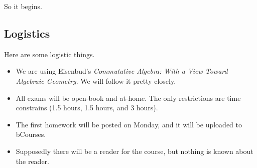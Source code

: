 







So it begins.

\subsection{Logistics}
Here are some logistic things.
\begin{itemize}
	\item We are using Eisenbud's \textit{Commutative Algebra: With a View Toward Algebraic Geometry}. We will follow it pretty closely.
	\item All exams will be open-book and at-home. The only restrictions are time constrains (1.5 hours, 1.5 hours, and 3 hours).
	\item The first homework will be posted on Monday, and it will be uploaded to bCourses.
	\item Supposedly there will be a reader for the course, but nothing is known about the reader.
\end{itemize}

